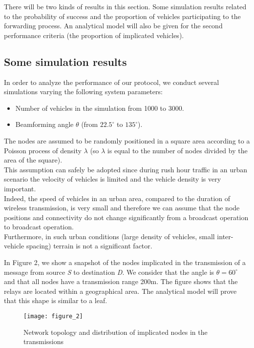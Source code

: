 \documentclass{IEEEtran}
\begin{document}
There will be two kinds of results in this section. Some simulation
results related to the probability of success and the proportion of
vehicles participating to the forwarding process. An analytical
model will also be given for the second performance criteria (the
proportion of implicated vehicles).

\subsection{Some simulation results}


In order to analyze the performance of our protocol, we conduct
several simulations varying the following system parameters:

\begin{itemize}
\item Number of vehicles in the simulation from 1000 to 3000.
\item Beamforming angle $\theta$ (from $22.5^{\circ}$ to $135^{\circ}$).
\end{itemize}


The nodes are assumed to be randomly positioned in a square area
according to a Poisson process of density $\lambda$ (so $\lambda$ is
equal to the number of nodes divided by the area of the square).\\
This assumption can safely be adopted since during rush hour traffic
in an urban scenario the velocity of vehicles is
limited and the vehicle density is very important.\\
Indeed, the speed of vehicles in an urban area, compared to the
duration of wireless transmission, is very small and therefore we
can assume that the node positions and connectivity
do not change significantly from a broadcast operation to broadcast operation.\\
Furthermore, in such urban conditions (large density of vehicles,
small inter-vehicle spacing) terrain is not a significant factor.


In Figure 2, we show a snapshot of the nodes implicated in the
transmission of a message from source \emph{S} to destination
\emph{D}. We consider that the angle is
    $\theta=60^{\circ}$
and that all nodes have a transmission range 200m. The figure shows
that the relays are located within a geographical area.  The
analytical model will prove that this shape is similar to a leaf.
\begin{figure}[!htbp]
  \begin{center}
\texttt{[image: figure\_2]}
  \end{center}
  \caption{Network topology and distribution of implicated nodes in the transmissions}
\end{figure}
\end{document}
